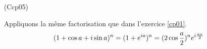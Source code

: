 \begin{tiny}(Ccp05)\end{tiny} Appliquons la même factorisation que dans l'exercice \ref{cp01}.
\begin{displaymath}
 (1+\cos a + i\sin a)^n = (1+e^{ia})^n\\
= (2\cos\frac{a}{2})^n e^{i\frac{na}{2}}
\end{displaymath}
